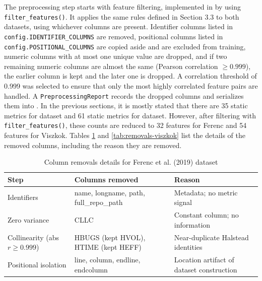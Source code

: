 The preprocessing step starts with feature filtering, implemented in  by using \texttt{filter\_features()}. It applies the same rules defined in Section 3.3 to both datasets, using whichever columns are present. Identifier columns listed in \texttt{config.IDENTIFIER\_COLUMNS} are removed, positional columns listed in \texttt{config.POSITIONAL\_COLUMNS} are copied aside and are excluded from training, numeric columns with at most one unique value are dropped, and if two remaining numeric columns are almost the same (Pearson correlation $\geq 0.999$), the earlier column is kept and the later one is dropped. A correlation threshold of 0.999 was selected to ensure that only the most highly correlated feature pairs are handled. A \texttt{PreprocessingReport} records the dropped columns and serializes them into . In the previous sections, it is mostly stated that there are 35 static metrics for \citet{ferenc_challenging_2019} dataset and 61 static metrics for \citet{viszkok_improving_2021} dataset. However, after filtering with \texttt{filter\_features()}, these counts are reduced to 32 features for Ferenc and 54 features for Viszkok. Tables \ref{tab:removals-ferenc} and \ref{tab:removals-viszkok} list the details of the removed columns, including the reason they are removed.

\begin{table}[H]
  \centering
  \caption{Column removals details for Ferenc et al. (2019) dataset}
  \label{tab:removals-ferenc}
  \begin{tabularx}{\textwidth}{|>{\raggedright\arraybackslash}p{2.8cm}|>{\raggedright\arraybackslash}X|>{\raggedright\arraybackslash}X|}
    \hline
    \textbf{Step} & \textbf{Columns removed} & \textbf{Reason} \\
    \hline
    Identifiers & name, longname, path, full\_repo\_path & Metadata; no metric signal \\
    \hline
    Zero variance & CLLC & Constant column; no information \\
    \hline
    Collinearity (abs $r \ge 0.999$) & HBUGS (kept HVOL), HTIME (kept HEFF) & Near-duplicate Halstead identities \\
    \hline
    Positional isolation & line, column, endline, endcolumn & Location artifact of dataset construction \\
    \hline
  \end{tabularx}
\end{table}

